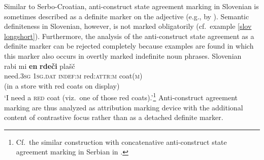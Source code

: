 Similar to Serbo-Croatian, anti\hyp{}construct state agreement marking in Slovenian is sometimes described as a definite marker on the adjective (e.g., by \citealt[411]{priestly1993}). Semantic definiteness in Slovenian, however, is not marked obligatorily (cf.~example \ref{slov longshort}). Furthermore, the analysis of the anti\hyp{}construct state agreement as a definite marker can be rejected completely because examples are found in which this marker also occurs in overtly marked indefinite noun phrases.
\ea
{\rm Slovenian \citep{marusic-etal2007}}\\
\gll 	rabi mi \textbf{en} \textbf{rde\v{c}i} pla\v{s}\v{c}\\
	need.\textsc{3sg} \textsc{1sg.dat} \textsc{indef:m} red:\textsc{attr:m} coat(\textsc{m})\\
\glt (in a store with red coats on display)\\‘I need a \textsc{red} coat (viz.~one of those red coats).’\footnote{Cf.~the similar construction with concatenative anti\hyp{}construct state agreement marking in Serbian in .}
\z
Anti\hyp{}construct agreement marking are thus analyzed as attribution marking device with the additional content of contrastive focus rather than as a detached definite marker.

